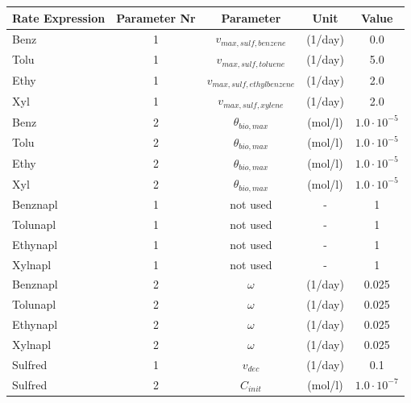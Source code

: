 \begin{table}[hb]

\centering
\footnotesize
\begin{tabular*}{\textwidth}{@{\extracolsep{\fill}}lcccc}
\toprule
Rate Expression & Parameter Nr & Parameter & Unit & Value \\
\midrule
Benz        & 1 & $v_{max,sulf,benzene}$     & (1/day)     & 0.0   \\
Tolu        & 1 & $v_{max,sulf,toluene}$     & (1/day)     & 5.0   \\
Ethy        & 1 & $v_{max,sulf,ethylbenzene}$& (1/day)     & 2.0   \\
Xyl         & 1 & $v_{max,sulf,xylene}   $   & (1/day)     & 2.0   \\
Benz        & 2 & $\theta_{bio,max}$ & (mol/l)              &  $1.0 \cdot 10^{-5}$  \\
Tolu        & 2 & $\theta_{bio,max}$ & (mol/l)              &  $1.0 \cdot 10^{-5}$  \\
Ethy        & 2 & $\theta_{bio,max}$ & (mol/l)              &  $1.0 \cdot 10^{-5}$  \\
Xyl         & 2 & $\theta_{bio,max}$ & (mol/l)              &  $1.0 \cdot 10^{-5}$  \\
Benznapl    & 1 & not used         & -   &  1  \\
Tolunapl    & 1 & not used         & -   &  1  \\
Ethynapl    & 1 & not used         & -   &  1  \\
Xylnapl     & 1 & not used         & -   &  1  \\
Benznapl    & 2 & $\omega$  & (1/day)       & 0.025   \\
Tolunapl    & 2 & $\omega$  & (1/day)       & 0.025   \\
Ethynapl    & 2 & $\omega$  & (1/day)       & 0.025   \\
Xylnapl     & 2 & $\omega$  & (1/day)       & 0.025   \\
Sulfred & 1 & $v_{dec} $    & (1/day)                      &   0.1   \\
Sulfred & 2 & $C_{init}$    & (mol/l)                      &  $1.0 \cdot 10^{-7}$  \\
\bottomrule
\end{tabular*}
\label{tab:eh_rate_const}
\end{table}